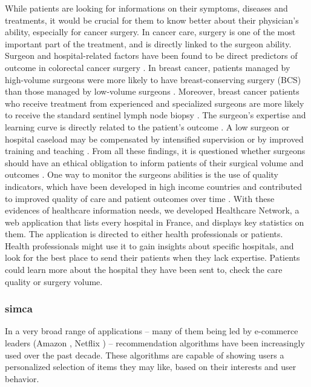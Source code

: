 While patients are looking for informations on their symptoms, diseases and
treatments, it would be crucial for them to know better about their physician's
ability, especially for cancer surgery. In cancer care, surgery is one of the
most important part of the treatment, and is directly linked to the surgeon
ability.
Surgeon and hospital-related factors have been found to be direct predictors of
outcome in colorectal cancer surgery \cite{renzulli_influence_2006,
    bonati_surgeon_2021}. In breast cancer, patients managed by high-volume surgeons
were more likely to have breast-conserving surgery (BCS) than those managed by
low-volume surgeons \cite{mcdermott_surgeon_2013}. Moreover, breast cancer
patients who receive treatment from experienced and specialized surgeons are
more likely to receive the standard sentinel lymph node biopsy
\cite{yen_surgeon_2014}. The surgeon's expertise and learning curve is directly
related to the patient's outcome \cite{renzulli_learning_2005}. A low surgeon or
hospital caseload may be compensated by intensified supervision or by improved
training and teaching \cite{bonati_surgeon_2021}. From all these findings, it is
questioned whether surgeons should have an ethical obligation to inform patients
of their surgical volume and outcomes \cite{glaser_surgeon_2019}. One way to
monitor the surgeons abilities is the use of quality indicators, which have been
developed in high income countries and contributed to improved quality of care
and patient outcomes over time \cite{nietz_quality_2020}.
With these evidences of healthcare information needs, we developed Healthcare
Network, a web application that lists every hospital in France, and displays key
statistics on them. The application is directed to either health professionals
or patients. Health professionals might use it to gain insights about specific
hospitals, and look for the best place to send their patients when they lack
expertise. Patients could learn more about the hospital they have been sent to,
check the care quality or surgery volume.

\subsubsection{\acl{simca}}

In a very broad range of applications -- many of them being led by e-commerce
leaders (Amazon \cite{linden_amazoncom_2003}, Netflix \cite{koren_matrix_2009})
-- recommendation algorithms have been increasingly used over the past decade.
These algorithms are capable of showing users a personalized selection of items
they may like, based on their interests and user behavior.

